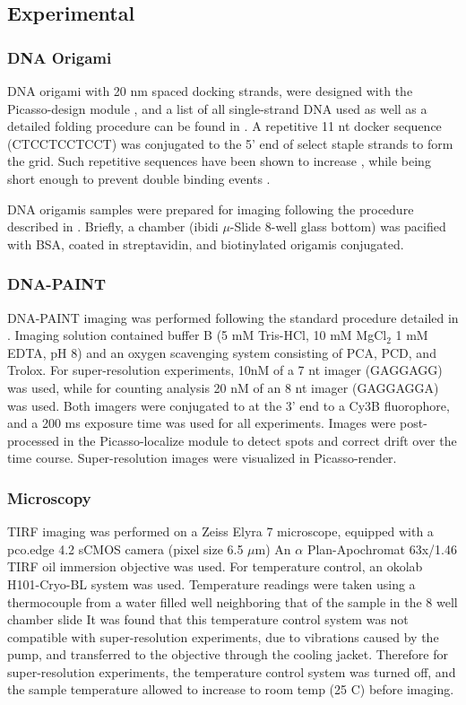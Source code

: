 \subsection{Experimental}
\subsubsection{DNA Origami}
DNA origami with 20 nm spaced docking strands, were designed with the Picasso-design module \cite{X}, 
  and a list of all single-strand DNA used as well as a detailed folding procedure can be found in \cite{X}.
  A repetitive 11 nt docker sequence (CTCCTCCTCCT) was conjugated to the 5' end of select staple strands to form the grid.
  Such repetitive sequences have been shown to increase \pon, while being short enough to prevent double binding events \cite{X}.

  DNA origamis samples were prepared for imaging following the procedure described in \cite{}. 
  Briefly, a chamber (ibidi $\mu$-Slide 8-well glass bottom) was pacified with BSA, coated in streptavidin, and biotinylated origamis conjugated. 

\subsubsection{DNA-PAINT}
DNA-PAINT imaging was performed following the standard procedure detailed in \cite{}. 
  Imaging solution contained buffer B (5 mM Tris-HCl, 10 mM MgCl$_2$ 1 mM EDTA, pH 8) and an oxygen scavenging system consisting of PCA, PCD, and Trolox.
  For super-resolution experiments, 10nM of a 7 nt imager (GAGGAGG) was used, while for \ours counting analysis 
  20 nM of an 8 nt imager (GAGGAGGA) was used.
  Both imagers were conjugated to at the 3' end to a Cy3B fluorophore, and a 200 ms exposure time was used for all experiments.
  Images were post-processed in the Picasso-localize module to detect spots and correct drift over the time course. 
  Super-resolution images were visualized in Picasso-render.

\subsubsection{Microscopy}
TIRF imaging was performed on a Zeiss Elyra 7 microscope, equipped with a pco.edge 4.2 sCMOS camera (pixel size 6.5 $\mu$m)
  An $\alpha$ Plan-Apochromat 63x/1.46 TIRF oil immersion objective was used.
  For temperature control, an okolab H101-Cryo-BL system was used. Temperature readings were taken using a thermocouple from a water filled well neighboring 
  that of the sample in the 8 well chamber slide 
  It was found that this temperature control system was not compatible with super-resolution experiments, 
  due to vibrations caused by the pump, and transferred to the objective through the cooling jacket.
  Therefore for super-resolution experiments, the temperature control system was turned off, 
  and the sample temperature allowed to increase to room temp (25 C) before imaging.


